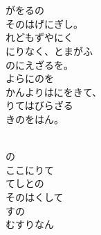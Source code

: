 \documentclass[10pt,b5j]{tarticle} %
\begin{document}
\vspace{1.5em} %
\newcommand{\linespace}{0.5em} %
\newcommand{\blocksize}{0.5\hsize} %
\newcommand{\itemmargin}{3em} %
\begin{enumerate} %
    \setlength{\itemindent}{\itemmargin} %
    \begin{minipage}[c]{\blocksize}
    
        \vspace{\linespace}
        \item~\\
         \\
        がをるの\\
        そのはげにぎし。\\
        れどもずやにく\\
        にりなく、とまがふ\\
        のにえざるを。\\
        よらにのを\\
        かんよりはにをきて、\\
        りてはびらざる\\
        きのをはん。
        
    \end{minipage}
    \begin{minipage}[c]{\blocksize}
        
        \vspace{\linespace}
        \item~\\
        の\\
        ここにりて\\
        てしとの\\
        そのはくして\\
        すの\\
        むすりなん
        

\end{minipage}
\end{enumerate}
\end{document}
